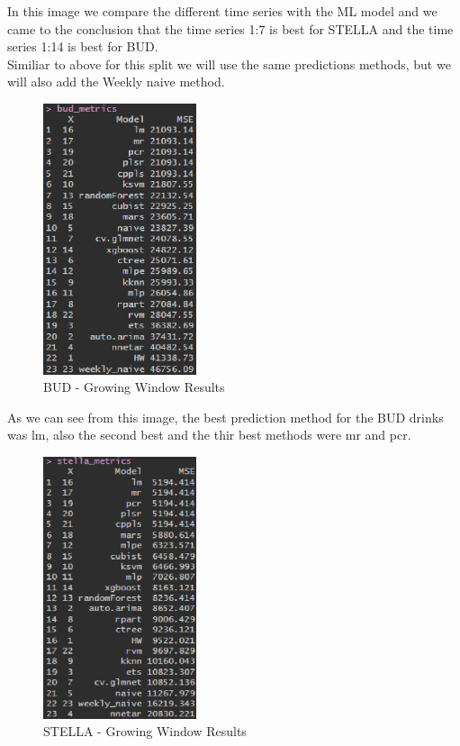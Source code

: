 In this image we compare the different time series with the ML model and we came to the conclusion that the time series 1:7 is best for STELLA and the time series 1:14 is best for BUD.\\


Similiar to above for this split we will use the same predictions methods, but we will also add the Weekly naive method.\\



\begin{figure}[H]
    \centering
    \includegraphics[width=0.4\textwidth]{assets/bud-gw.png}
    \caption{BUD - Growing Window Results}
    \label{fig:gw_bud}
    \end{figure}

As we can see from this image, the best prediction method for the BUD drinks was lm, also the second best and the thir best methods were mr and pcr.\\

\begin{figure}[H]
    \centering
    \includegraphics[width=0.4\textwidth]{assets/stella-gw.png}
    \caption{STELLA - Growing Window Results}
    \label{fig:gw_stella}
    \end{figure}

